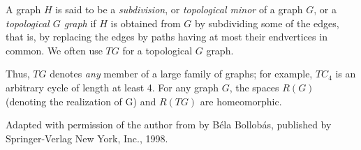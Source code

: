 \documentclass[12pt]{article}
\begin{document}
A graph $H$ is said to be a \emph{subdivision}, or \emph{topological minor} of a graph $G$, or a \emph{topological $G$ graph} if $H$ is obtained from $G$ by subdividing some of the edges, that is, by replacing the edges by paths having at most their endvertices in common. We often use $TG$ for a topological $G$ graph.

Thus, $TG$ denotes \emph{any} member of a large family of graphs; for example, $TC_4$ is an arbitrary cycle of length at least 4. For any graph $G$, the spaces $R(G)$ (denoting the realization of G) and $R(TG)$ are homeomorphic.


\footnotesize{Adapted with permission of the author from \emph{} by B\'{e}la Bollob\'{a}s, published by Springer-Verlag New York, Inc., 1998.}
\end{document}
